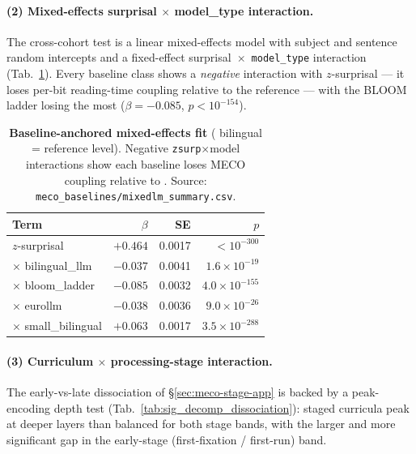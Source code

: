 \paragraph{(2) Mixed-effects surprisal $\times$ model\_type interaction.} The cross-cohort test is a linear mixed-effects model with subject and sentence random intercepts and a fixed-effect surprisal~$\times$~\texttt{model\_type} interaction (Tab.~\ref{tab:sig_mixedlm_baselines}). Every baseline class shows a \emph{negative} interaction with $z$-surprisal --- it loses per-bit reading-time coupling relative to the \beetle{} reference --- with the BLOOM ladder losing the most ($\beta=-0.085$, $p<10^{-154}$).

\begin{table}[!ht]
  \centering
  \small
  \caption{\textbf{Baseline-anchored mixed-effects fit} (\beetle{} bilingual = reference level). Negative \texttt{zsurp}$\times$model interactions show each baseline loses MECO coupling relative to \beetle{}. Source: \texttt{meco\_baselines/mixedlm\_summary.csv}.}
  \label{tab:sig_mixedlm_baselines}
  \begin{tabular}{lrrr}
    \toprule
    Term & $\beta$ & SE & $p$ \\
    \midrule
    $z$-surprisal                          & $+0.464$ & 0.0017 & $<10^{-300}$ \\
    \quad $\times$ bilingual\_llm          & $-0.037$ & 0.0041 & $1.6{\times}10^{-19}$ \\
    \quad $\times$ bloom\_ladder           & $-0.085$ & 0.0032 & $4.0{\times}10^{-155}$ \\
    \quad $\times$ eurollm                 & $-0.038$ & 0.0036 & $9.0{\times}10^{-26}$ \\
    \quad $\times$ small\_bilingual        & $+0.063$ & 0.0017 & $3.5{\times}10^{-288}$ \\
    \bottomrule
  \end{tabular}
\end{table}

\paragraph{(3) Curriculum $\times$ processing-stage interaction.} The early-vs-late dissociation of \S\ref{sec:meco-stage-app} is backed by a peak-encoding depth test (Tab.~\ref{tab:sig_decomp_dissociation}): staged curricula peak at deeper layers than balanced for both stage bands, with the larger and more significant gap in the early-stage (first-fixation / first-run) band.

